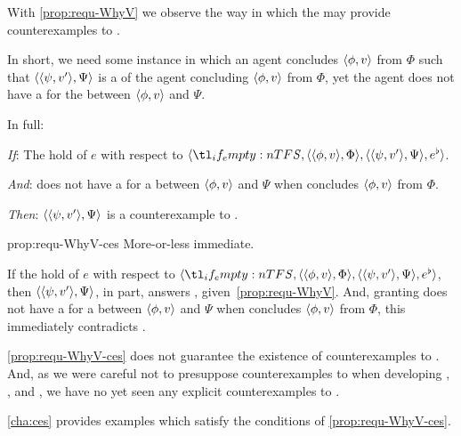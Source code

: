 \begin{note}
  With \autoref{prop:requ-WhyV} we observe the way in which the  may provide counterexamples to \issueConstraint{}.

  In short, we need some instance in which an agent concludes \(\langle \phi, v \rangle\) from \(\Phi\) such that \(\langle \langle \psi, v' \rangle, \Psi \rangle\) is a \requ{} of the agent concluding \(\langle \phi, v \rangle\) from \(\Phi\), yet the agent does not have a \wit{} for the \ros{} between \(\langle \phi, v \rangle\) and \(\Psi\).

  In full:

  \begin{proposition}
    \label{prop:requ-WhyV-ces}
    \vspace{-\baselineskip}
    \begin{itenum}
    \item[\emph{If}:]
      The  hold of \(e\) with respect to \(\langle \vAgent{}, \pvp{\phi}{v}{\Phi}, \pvp{\psi}{v'}{\Psi}, e^{\flat} \rangle\).
    \item[\emph{And}:]
      \label{prop:requ-WhyVCes:noW}
      \vAgent{} does not have a \wit{} for a \ros{} between \(\langle \phi, v \rangle\) and \(\Psi\) when \vAgent{} concludes \(\langle \phi, v \rangle\) from \(\Phi\).
    \item[\emph{Then}:]
      \(\langle \langle \psi, v' \rangle, \Psi \rangle\) is a counterexample to \issueConstraint{}.
    \end{itenum}
    \vspace{-\baselineskip}
  \end{proposition}

  \begin{argument}{prop:requ-WhyV-ces}
    More-or-less immediate.

    If the  hold of \(e\) with respect to \(\langle \vAgent{}, \pvp{\phi}{v}{\Phi}, \pvp{\psi}{v'}{\Psi}, e^{\flat} \rangle\), then \(\langle \langle \psi, v' \rangle, \Psi \rangle\), in part, answers \qWhyV{}, given~\autoref{prop:requ-WhyV}.
    And, granting \vAgent{} does not have a \wit{} for a \ros{} between \(\langle \phi, v \rangle\) and \(\Psi\) when \vAgent{} concludes \(\langle \phi, v \rangle\) from \(\Phi\), this immediately contradicts \issueConstraint{}.
  \end{argument}
\end{note}

\begin{note}
  \autoref{prop:requ-WhyV-ces} does not guarantee the existence of counterexamples to \issueConstraint{}.
  And, as we were careful not to presuppose counterexamples to \issueConstraint{} when developing , , and , we have no yet seen any explicit counterexamples to \issueConstraint{}.

  \autoref{cha:ces} provides examples which satisfy the conditions of \autoref{prop:requ-WhyV-ces}.
\end{note}

